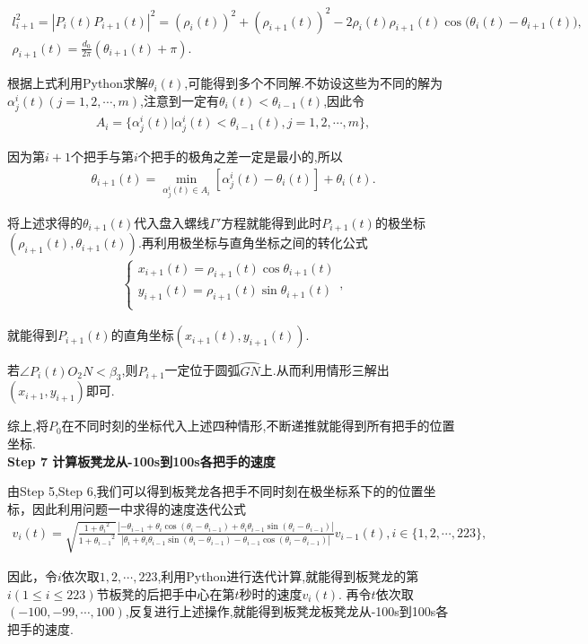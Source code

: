 \documentclass[../main.tex]{subfiles}
\begin{document}
    \begin{gather}\label{1.........458}
l_{i+1}^{2}=|P_i(t)P_{i+1}(t)|^2=(\rho _i(t))^2+(\rho _{i+1}(t))^2-2\rho _i(t)\rho _{i+1}(t)\cos\mathrm{(}\theta _i(t)-\theta _{i+1}(t)),
\\
\rho _{i+1}(t)=\frac{d_0}{2\pi}\left( \theta _{i+1}(t)+\pi \right) .
\end{gather}
\par 根据上式利用Python求解\(\theta _{i}(t)\),可能得到多个不同解.不妨设这些为不同的解为\(\alpha _{j}^{i}(t) (j = 1,2,\cdots ,m)\),注意到一定有\(\theta _{i}(t)<\theta _{i-1}(t)\),因此令
\begin{align}\label{1.........459}
A_i = \{ \alpha _{j}^{i}(t) |\alpha _{j}^{i}(t) <\theta _{i-1}(t),j = 1,2,\cdots ,m \},
\end{align}
\par 因为第\(i + 1\)个把手与第$i$个把手的极角之差一定是最小的,所以
\begin{align}\label{1.........460}
\theta _{i+1}(t)=\underset{\alpha _{j}^{i}(t)\in A_i}{\min}\left[ \alpha _{j}^{i}\left( t \right) -\theta _i\left( t \right) \right] +\theta _i\left( t \right) .
\end{align}
\par 将上述求得的\(\theta _{i+1}(t)\)代入盘入螺线$\varGamma'$方程就能得到此时\(P_{i+1}(t)\)的极坐标\((\rho _{i+1}(t),\theta _{i+1}(t))\).再利用极坐标与直角坐标之间的转化公式
\begin{align}\label{1.........461}
\begin{cases}
x_{i+1}(t)=\rho _{i+1}(t)\cos \theta _{i+1}(t)\\
y_{i+1}(t)=\rho _{i+1}(t)\sin \theta _{i+1}(t)\\
\end{cases}, 
\end{align}
\par 就能得到\(P_{i+1}(t)\)的直角坐标\((x_{i+1}(t),y_{i+1}(t))\).

\par 若$\angle P_i(t)O_2N< \beta_3$,则$P_{i+1}$一定位于圆弧$\wideparen{GN}$上.从而利用情形三解出$(x_{i+1},y_{i+1})$即可.

\par 综上,将$P_0$在不同时刻的坐标代入上述四种情形,不断递推就能得到所有把手的位置坐标.
\\\noindent\textbf{Step 7 计算板凳龙从-100s到100s各把手的速度} 
 \par 由Step 5,Step 6,我们可以得到板凳龙各把手不同时刻在极坐标系下的的位置坐标，因此利用问题一中求得的速度迭代公式
 \begin{align}
    v_i(t) = \sqrt{\frac{1 + {\theta _i}^2}{1 + {\theta _{i - 1}}^2}}\frac{|-\theta _{i - 1}+\theta _i\cos(\theta _{i }-\theta _{i-1})+\theta _i\theta _{i - 1}\sin(\theta _{i }-\theta _{i-1})|}{|\theta _i+\theta _i\theta _{i - 1}\sin(\theta _i -\theta _{i-1})-\theta _{i - 1}\cos(\theta _i -\theta _{i-1})|} v_{i - 1}(t), i\in \{1, 2, \cdots, 223\},
    \end{align}
   \par  因此，令\(i\)依次取\(1, 2, \cdots, 223\),利用Python进行迭代计算,就能得到板凳龙的第\(i(1\leqslant i\leqslant 223)\)节板凳的后把手中心在第\(t\)秒时的速度\(v_i(t)\).
再令\(t\)依次取$(-100, -99, \cdots, 100)$,反复进行上述操作,就能得到板凳龙板凳龙从-100s到100s各把手的速度.  
\end{document}
